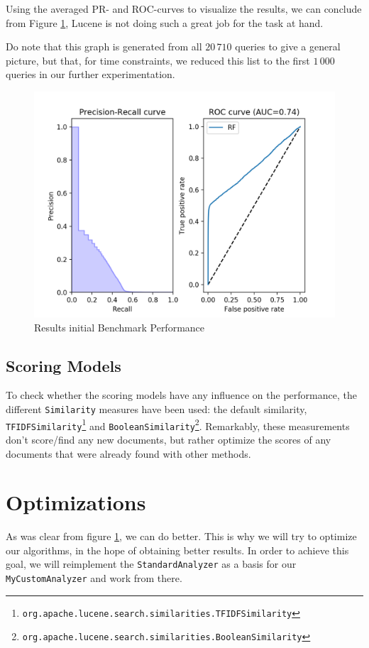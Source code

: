 \documentclass[11pt]{article}
\begin{document}
Using the averaged PR- and ROC-curves to visualize the results, we can conclude from Figure \ref{fig:initBP}, Lucene is not doing such a great job for the task at hand.

Do note that this graph is generated from all $20\,710$ queries to give a general picture, but that, for time constraints, we reduced this list to the first $1\,000$ queries in our further experimentation.

\begin{figure}[h!]
    \centering
    \includegraphics[width=\textwidth]{images/StandardAnalyzer}
    \caption{Results initial Benchmark Performance}
    \label{fig:initBP}
\end{figure}


\subsection{Scoring Models}
To check whether the scoring models have any influence on the performance, the different \texttt{Similarity} measures have been used: the default similarity, \texttt{TFIDFSimilarity}\footnote{\texttt{org.apache.lucene.search.similarities.TFIDFSimilarity}} and \texttt{BooleanSimilarity}\footnote{\texttt{org.apache.lucene.search.similarities.BooleanSimilarity}}. Remarkably, these measurements don't score/find any new documents, but rather optimize the scores of any documents that were already found with other methods.

\section{Optimizations}\label{sec:optimizations}
As was clear from figure \ref{fig:initBP}, we can do better. This is why we will try to optimize our algorithms, in the hope of obtaining better results. In order to achieve this goal, we will reimplement the \texttt{StandardAnalyzer} as a basis for our \texttt{MyCustomAnalyzer} and work from there.
\end{document}
